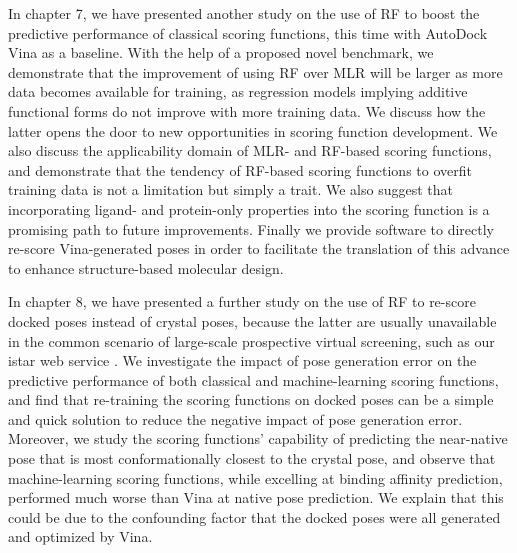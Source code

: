 In chapter 7, we have presented another study on the use of RF to boost the predictive performance of classical scoring functions, this time with AutoDock Vina \citep{595} as a baseline. With the help of a proposed novel benchmark, we demonstrate that the improvement of using RF over MLR will be larger as more data becomes available for training, as regression models implying additive functional forms do not improve with more training data. We discuss how the latter opens the door to new opportunities in scoring function development. We also discuss the applicability domain of MLR- and RF-based scoring functions, and demonstrate that the tendency of RF-based scoring functions to overfit training data is not a limitation but simply a trait. We also suggest that incorporating ligand- and protein-only properties into the scoring function is a promising path to future improvements. Finally we provide software to directly re-score Vina-generated poses in order to facilitate the translation of this advance to enhance structure-based molecular design.

In chapter 8, we have presented a further study on the use of RF to re-score docked poses instead of crystal poses, because the latter are usually unavailable in the common scenario of large-scale prospective virtual screening, such as our istar web service \citep{1362}. We investigate the impact of pose generation error on the predictive performance of both classical and machine-learning scoring functions, and find that re-training the scoring functions on docked poses can be a simple and quick solution to reduce the negative impact of pose generation error. Moreover, we study the scoring functions' capability of predicting the near-native pose that is most conformationally closest to the crystal pose, and observe that machine-learning scoring functions, while excelling at binding affinity prediction, performed much worse than Vina at native pose prediction. We explain that this could be due to the confounding factor that the docked poses were all generated and optimized by Vina.

